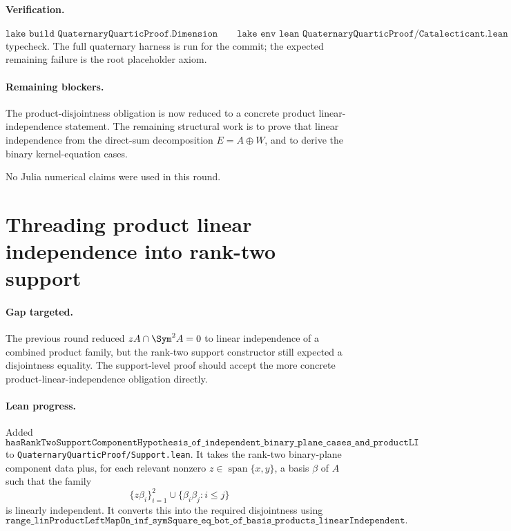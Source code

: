 \documentclass[11pt]{article}
\begin{document}
\paragraph{Verification.}
\[
\texttt{lake build QuaternaryQuarticProof.Dimension}
\qquad
\texttt{lake env lean QuaternaryQuarticProof/Catalecticant.lean}
\]
typecheck.  The full quaternary harness is run for the commit; the expected
remaining failure is the root placeholder axiom.

\paragraph{Remaining blockers.}
The product-disjointness obligation is now reduced to a concrete product
linear-independence statement.  The remaining structural work is to prove that
linear independence from the direct-sum decomposition \(E=A\oplus W\), and to
derive the binary kernel-equation cases.

No Julia numerical claims were used in this round.

\section*{Threading product linear independence into rank-two support}

\paragraph{Gap targeted.}
The previous round reduced \(zA\cap\Sym^2A=0\) to linear independence of a
combined product family, but the rank-two support constructor still expected a
disjointness equality.  The support-level proof should accept the more
concrete product-linear-independence obligation directly.

\paragraph{Lean progress.}
Added
\[
\texttt{hasRankTwoSupportComponentHypothesis\_of\_independent\_binary\_plane\_cases\_and\_productLI}
\]
to \texttt{QuaternaryQuarticProof/Support.lean}.  It takes the rank-two
binary-plane component data plus, for each relevant nonzero
\(z\in\operatorname{span}\{x,y\}\), a basis \(\beta\) of \(A\) such that the
family
\[
\{z\beta_i\}_{i=1}^2
\cup
\{\beta_i\beta_j:i\le j\}
\]
is linearly independent.  It converts this into the required disjointness using
\[
\texttt{range\_linProductLeftMapOn\_inf\_symSquare\_eq\_bot\_of\_basis\_products\_linearIndependent}.
\]
\end{document}
